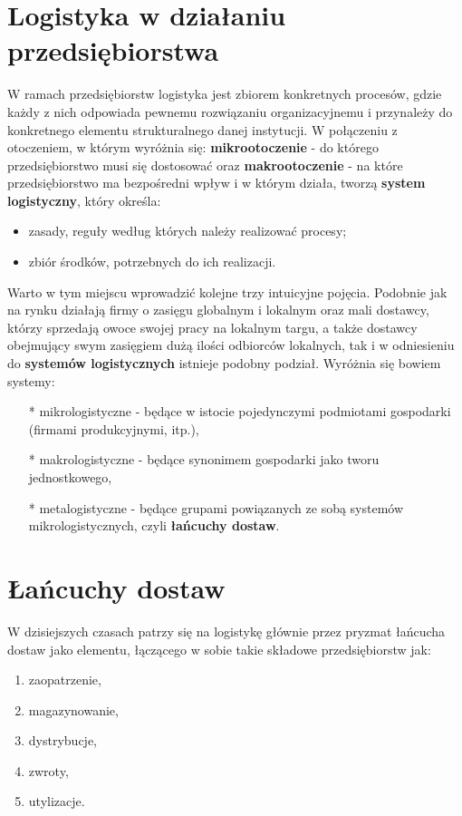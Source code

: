 \section{Logistyka w działaniu przedsiębiorstwa}  
	W ramach przedsiębiorstw logistyka jest zbiorem konkretnych procesów, 
	gdzie każdy z nich odpowiada pewnemu rozwiązaniu organizacyjnemu i przynależy do konkretnego 
	elementu strukturalnego danej instytucji. W połączeniu z otoczeniem, w którym wyróżnia się:
	\textbf{mikrootoczenie} - do którego przedsiębiorstwo musi się dostosować oraz 
	\textbf{makrootoczenie} - na które przedsiębiorstwo ma bezpośredni wpływ i w którym działa,
	tworzą \textbf{system logistyczny}, który określa:
	\begin{itemize}
		\item zasady, reguły według których należy realizować procesy;
		\item zbiór środków, potrzebnych do ich realizacji.
	\end{itemize}
	Warto w tym miejscu wprowadzić kolejne trzy intuicyjne pojęcia. Podobnie jak na rynku
	działają firmy o zasięgu globalnym i lokalnym oraz mali dostawcy, którzy sprzedają
	owoce swojej pracy na lokalnym targu, a także dostawcy obejmujący swym zasięgiem dużą ilości
	odbiorców lokalnych, tak i w odniesieniu do \textbf{systemów logistycznych}
	istnieje podobny podział. Wyróżnia się bowiem systemy:
	\begin{itemize}
		\item[*] mikrologistyczne 	- będące w istocie pojedynczymi podmiotami gospodarki (firmami produkcyjnymi, itp.),
		\item[*] makrologistyczne 	- będące synonimem gospodarki jako tworu jednostkowego,
		\item[*] metalogistyczne	- będące grupami powiązanych ze sobą systemów mikrologistycznych, 
		czyli \textbf{łańcuchy dostaw}\cite{systemy_logistyczne_podstawy_funkcjonowania}.
	\end{itemize}

\section{Łańcuchy dostaw}
\label{c2:supply_chains}
	W dzisiejszych czasach patrzy się na logistykę 
	głównie przez pryzmat łańcucha dostaw jako
	elementu, łączącego w sobie takie składowe przedsiębiorstw jak:
	\begin{enumerate}
		\item zaopatrzenie,
		\item magazynowanie,
		\item dystrybucje,
		\item zwroty,
		\item utylizacje.
	\end{enumerate}
	
